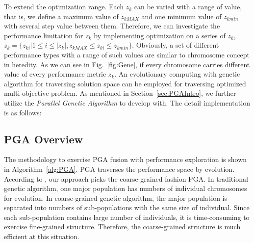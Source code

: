    To extend the optimization range. Each $z_k$ can be varied with a range of value, that is, we define a maximum value of $z_{kMAX}$ and one minimum value of $z_{kmin}$ with several step value between them. Therefore, we can investigate the performance limitation for $z_k$ by implementing optimization on a series of $z_k$, $z_k=\{z_{ki}| 1 \leq i \leq |z_k|, z_{kMAX} \leq z_{ki} \leq z_{kmin} \}$. Obviously, a set of different performance types with a range of such values are similar to chromosome concept in heredity. As we can see in Fig.~\ref{fig:Gene}, if every chromosome carries different value of every performance metric $z_k$. An evolutionary computing with genetic algorithm for traversing solution space can be employed for traversing optimized multi-objective problem. As mentioned in Section~\ref{sec:PGAIntro}, we further utilize the {\it Parallel Genetic Algorithm} to develop with. The detail implementation is as follows:

    


    \subsection{PGA Overview}

      The methodology to exercise PGA fusion with performance exploration is shown in Algorithm~\ref{alg:PGA}. PGA traverses the performance space by evolution. According to \cite{SurveyDistPGA1997}, our approach picks the coarse-grained fashion PGA. In traditional genetic algorithm, one major population has numbers of individual chromosomes for evolution. In coarse-grained genetic algorithm, the major population is separated into numbers of sub-populations with the same size of individual. Since each sub-population contains large number of individuals, it is time-consuming to exercise fine-grained structure. Therefore, the coarse-grained structure is much efficient at this situation. 


